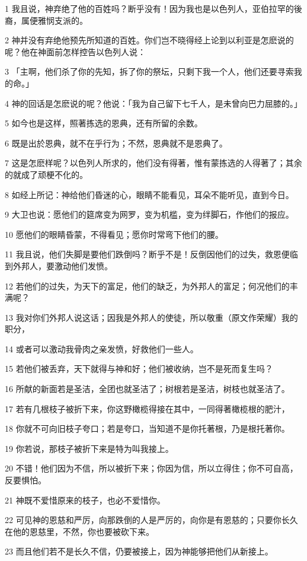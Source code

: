 \par 1 我且说，神弃绝了他的百姓吗？断乎没有！因为我也是以色列人，亚伯拉罕的後裔，属便雅悯支派的。
\par 2 神并没有弃绝他预先所知道的百姓。你们岂不晓得经上论到以利亚是怎麽说的呢？他在神面前怎样控告以色列人说：
\par 3 「主啊，他们杀了你的先知，拆了你的祭坛，只剩下我一个人，他们还要寻索我的命。」
\par 4 神的回话是怎麽说的呢？他说：「我为自己留下七千人，是未曾向巴力屈膝的。」
\par 5 如今也是这样，照著拣选的恩典，还有所留的余数。
\par 6 既是出於恩典，就不在乎行为；不然，恩典就不是恩典了。
\par 7 这是怎麽样呢？以色列人所求的，他们没有得著，惟有蒙拣选的人得著了；其余的就成了顽梗不化的。
\par 8 如经上所记：神给他们昏迷的心，眼睛不能看见，耳朵不能听见，直到今日。
\par 9 大卫也说：愿他们的筵席变为网罗，变为机槛，变为绊脚石，作他们的报应。
\par 10 愿他们的眼睛昏蒙，不得看见；愿你时常弯下他们的腰。
\par 11 我且说，他们失脚是要他们跌倒吗？断乎不是！反倒因他们的过失，救恩便临到外邦人，要激动他们发愤。
\par 12 若他们的过失，为天下的富足，他们的缺乏，为外邦人的富足；何况他们的丰满呢？
\par 13 我对你们外邦人说这话；因我是外邦人的使徒，所以敬重（原文作荣耀）我的职分，
\par 14 或者可以激动我骨肉之亲发愤，好救他们一些人。
\par 15 若他们被丢弃，天下就得与神和好；他们被收纳，岂不是死而复生吗？
\par 16 所献的新面若是圣洁，全团也就圣洁了；树根若是圣洁，树枝也就圣洁了。
\par 17 若有几根枝子被折下来，你这野橄榄得接在其中，一同得著橄榄根的肥汁，
\par 18 你就不可向旧枝子夸口；若是夸口，当知道不是你托著根，乃是根托著你。
\par 19 你若说，那枝子被折下来是特为叫我接上。
\par 20 不错！他们因为不信，所以被折下来；你因为信，所以立得住；你不可自高，反要惧怕。
\par 21 神既不爱惜原来的枝子，也必不爱惜你。
\par 22 可见神的恩慈和严厉，向那跌倒的人是严厉的，向你是有恩慈的；只要你长久在他的恩慈里，不然，你也要被砍下来。
\par 23 而且他们若不是长久不信，仍要被接上，因为神能够把他们从新接上。
